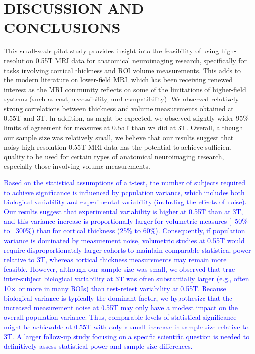 \documentclass[12pt,letterpaper,onecolumn]{article}
\newcommand{\mycomment}[1]
{\todo[caption={#1},color=red!100!green!33,noline]{\color{black} \begin{spacing}{0.5}#1\vspace{-0.5em}\end{spacing}}}
\begin{document}
\section{DISCUSSION AND CONCLUSIONS}\label{sec:conclusion}
This {\color{.} small-scale pilot} study provides insight into the feasibility of using high-resolution 0.55T MRI data for anatomical neuroimaging research, specifically for tasks involving cortical thickness and ROI volume measurements. {\color{.} This  adds to the modern literature on lower-field MRI, which has been receiving renewed interest as the MRI community reflects on some of the limitations of higher-field systems (such as cost, accessibility, and compatibility).}  We observed relatively strong correlations between thickness and volume measurements obtained at 0.55T and 3T. 
In addition, as might be expected, we observed slightly wider 95\% limits of agreement for measures at 0.55T than we did at 3T.  Overall, although our sample size was relatively small, we believe that our results suggest that noisy high-resolution 0.55T MRI data {has the potential} to achieve sufficient quality to be used for {certain types of} anatomical neuroimaging research, {especially those involving volume measurements.}

\textcolor{blue}{Based on the statistical assumptions of a t-test, the number of subjects required to achieve significance is influenced by population variance, which includes both biological variability and experimental variability (including the effects of noise). Our results suggest that experimental variability is higher at 0.55T than at 3T, and this variance increase is proportionally larger for volumetric measures (~50\% to ~300\%) than for cortical thickness (25\% to 60\%). Consequently, if population variance is dominated by measurement noise, volumetric studies at 0.55T would require disproportionately larger cohorts to maintain comparable statistical power relative to 3T, whereas cortical thickness measurements may remain more feasible. However, although our sample size was small, we observed that true inter-subject biological variability at 3T was often substantially larger (e.g., often 10$\times$ or more in many ROIs) than test-retest variability at 0.55T. Because biological variance is typically the dominant factor, we hypothesize that the increased measurement noise at 0.55T may only have a modest impact on the overall population variance. Thus, comparable levels of statistical significance might be achievable at 0.55T with only a small increase in sample size relative to 3T. A larger follow-up study focusing on a specific scientific question is needed to definitively assess statistical power and sample size differences.\mycomment{R1.2}}
\end{document}
